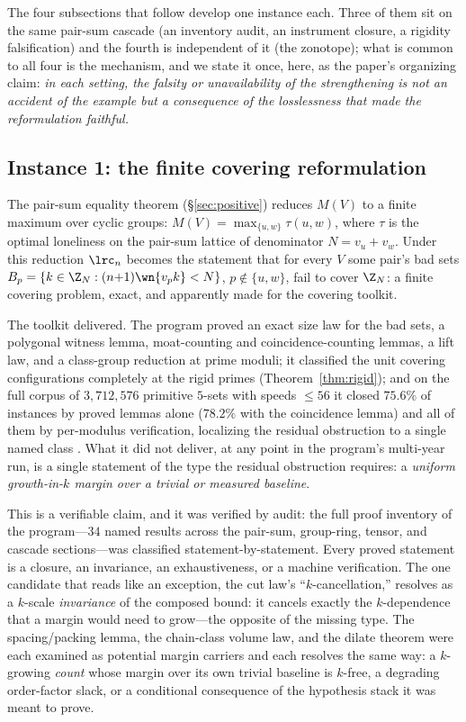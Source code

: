 The four subsections that follow develop one instance each. Three of
them sit on the same pair-sum cascade (an inventory audit, an instrument
closure, a rigidity falsification) and the fourth is independent of it
(the zonotope); what is common to all four is the mechanism, and we
state it once, here, as the paper's organizing claim: \emph{in each
setting, the falsity or unavailability of the strengthening is not an
accident of the example but a consequence of the losslessness that made
the reformulation faithful.}

\subsection{Instance 1: the finite covering reformulation}\label{sec:tm-covering}

The pair-sum equality theorem (\S\ref{sec:positive}) reduces
$M(V)$ to a finite maximum over cyclic groups: $M(V)=\max_{\{u,w\}}
\tau(u,w)$, where $\tau$ is the optimal loneliness on the pair-sum
lattice of denominator $N=v_u+v_w$. Under this reduction $\lrc_n$
becomes the statement that for every $V$ some pair's bad sets
$B_p=\{k\in\Z_N:(n{+}1)\wn{v_pk}<N\}$, $p\notin\{u,w\}$, fail to
cover $\Z_N$: a finite covering problem, exact, and apparently made for
the covering toolkit.

The toolkit delivered. The program proved an exact size law for the bad
sets, a polygonal witness lemma, moat-counting and coincidence-counting
lemmas, a lift law, and a class-group reduction at prime moduli; it
classified the unit covering configurations completely at the rigid
primes (Theorem~\ref{thm:rigid}); and on the full corpus of
$3{,}712{,}576$ primitive $5$-sets with speeds $\le 56$ it closed
$75.6\%$ of instances by proved lemmas alone ($78.2\%$ with the
coincidence lemma) and all of them by per-modulus verification,
localizing the residual obstruction to a single named class
\cite{prog-artifacts}. What it did not deliver, at any point in the
program's multi-year run, is a single statement of the type the residual
obstruction requires: a \emph{uniform growth-in-$k$ margin over a trivial
or measured baseline}.

This is a verifiable claim, and it was verified by audit: the full proof
inventory of the program---$34$ named results across the pair-sum,
group-ring, tensor, and cascade sections---was classified
statement-by-statement. Every proved statement is a closure, an
invariance, an exhaustiveness, or a machine verification. The one
candidate that reads like an exception, the cut law's
``$k$-cancellation,'' resolves as a $k$-scale \emph{invariance} of the
composed bound: it cancels exactly the $k$-dependence that a margin
would need to grow---the opposite of the missing type. The
spacing/packing lemma, the chain-class volume law, and the dilate theorem
were each examined as potential margin carriers and each resolves the
same way: a $k$-growing \emph{count} whose margin over its own trivial
baseline is $k$-free, a degrading order-factor slack, or a conditional
consequence of the hypothesis stack it was meant to prove.

